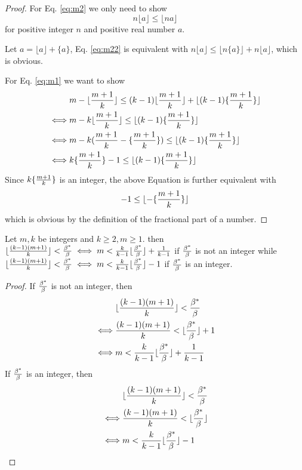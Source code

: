 \documentclass{article}
\begin{document}
\begin{proof}
	For Eq. \eqref{eq:m2} we only need to show
	\begin{equation}\label{eq:m22}
	n \lfloor a \rfloor \leq \lfloor n a \rfloor
	\end{equation}
	for positive integer $n$ and positive real number $a$.
	
	Let $a = \lfloor a \rfloor + \{ a \}$, Eq. \eqref{eq:m22} is equivalent with
	$n \lfloor a \rfloor \leq \lfloor n \{ a \} \rfloor + n \lfloor a \rfloor$, which is obvious.
	
	For Eq. \eqref{eq:m1} we want to show 
	\begin{align*}
     &	m - \lfloor {m + 1 \over k} \rfloor  \leq  (k-1)\lfloor {m + 1 \over k} \rfloor + \lfloor (k-1) \{ {m + 1 \over k }\}\rfloor \\
     \iff & m - k \lfloor {m + 1 \over k} \rfloor \leq \lfloor (k-1) \{ {m + 1 \over k }\}\rfloor \\
     \iff & m - k ({m + 1 \over k} - \{ {m+1 \over k }\}) \leq \lfloor (k-1) \{ {m + 1 \over k }\}\rfloor  \\
     \iff & k \{ {m+1 \over k }\} - 1 \leq \lfloor (k-1) \{ {m + 1 \over k }\}\rfloor  \\
	\end{align*}
	Since $k \{ {m+1 \over k }\}$ is an integer, the above Equation is further equivalent with
	$$
	- 1 \leq \lfloor - \{ {m + 1 \over k }\}\rfloor  
	$$
	which is obvious by the definition of the fractional part of a number.
\end{proof}
\begin{lemma}
Let $m,k$ be integers and $k\geq 2, m\geq 1$. then
$\lfloor {(k-1)(m+1) \over k} \rfloor < {\beta^\ast \over \beta} \iff m < \frac{k}{k-1} \lfloor \frac{\beta^\ast}{\beta} \rfloor + \frac{1}{k-1}$
if $\beta^\ast \over \beta$ is not an integer
while
$\lfloor {(k-1)(m+1) \over k} \rfloor < {\beta^\ast \over \beta} \iff  m < \frac{k}{k-1}\lfloor \frac{\beta^\ast}{\beta} \rfloor -1 $
if $\beta^\ast \over \beta$ is an integer.
\end{lemma}
\begin{proof}
If $\beta^\ast \over \beta$ is not an integer, then
\begin{align*}
& \lfloor {(k-1)(m+1) \over k} \rfloor < {\beta^\ast \over \beta}  \\
\iff & {(k-1)(m+1) \over k} < \lfloor{\beta^\ast \over \beta}\rfloor + 1 \\
\iff & m < \frac{k}{k-1} \lfloor \frac{\beta^\ast}{\beta} \rfloor + \frac{1}{k-1}
\end{align*}
If  $\beta^\ast \over \beta$ is an integer, then
\begin{align*}
& \lfloor {(k-1)(m+1) \over k} \rfloor < {\beta^\ast \over \beta}  \\
\iff & {(k-1)(m+1) \over k} < \lfloor{\beta^\ast \over \beta}\rfloor \\
\iff & m < \frac{k}{k-1} \lfloor \frac{\beta^\ast}{\beta} \rfloor -1
\end{align*}
\end{proof}
\end{document}
